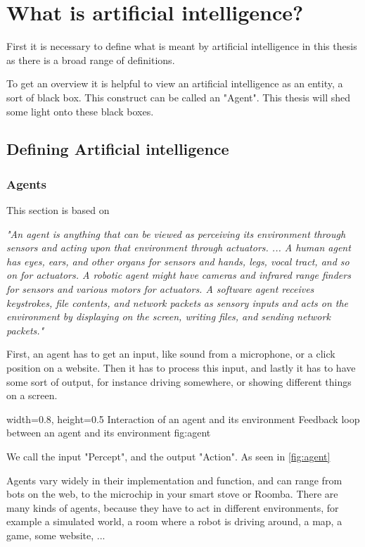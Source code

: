 \chapter{What is artificial intelligence?}
First it is necessary to define what is meant by artificial intelligence in this thesis as there is a broad range of definitions. \cite{definitionAI}

To get an overview it is helpful to view an artificial intelligence as an entity, a sort of black box. This construct can be called an "Agent". 
This thesis will shed some light onto these black boxes.

\section{Defining Artificial intelligence}
\subsection{Agents} 
This section is based on \cite[p. 34f]{MA}

\textit{
"An agent is anything that can be viewed as perceiving its environment through sensors and acting upon that environment through actuators.
...
A human agent has eyes, ears, and other organs for sensors and hands, legs, vocal tract, and so on for actuators. A robotic agent might have cameras and infrared range finders for sensors and various motors for actuators. A software agent receives keystrokes, file contents, and network packets as sensory inputs and acts on the environment by displaying on the screen,
writing files, and sending network packets."} \cite[p. 34]{MA}

First, an agent has to get an input, like sound from a microphone, or a click position on a website.
Then it has to process this input, and lastly it has to have some sort of output, for instance driving somewhere, or showing different things on a screen.

    {width=0.8\textwidth, height=0.5\textheight} %
    {Interaction of an agent and its environment}   %
    {Feedback loop between an agent and its environment}   %
    {fig:agent}    %

We call the input "Percept", and the output "Action". As seen in \autoref{fig:agent}

Agents vary widely in their implementation and function, and can range from bots on the web, to the microchip in your smart stove or Roomba. 
There are many kinds of agents, because they have to act in different environments, for example a simulated world, a room where a robot is driving around, a map, a game, some website, ...

